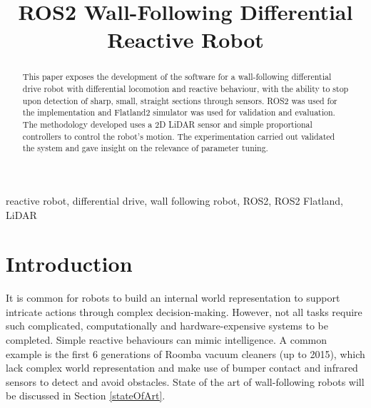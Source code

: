 \documentclass[conference]{IEEEtran}
\begin{document}
\title{ROS2 Wall-Following Differential Reactive Robot\\}

\author{
\and
{}
\and
{}
\and
{}
}

\maketitle

\begin{abstract}
This paper exposes the development of the software for a wall-following differential drive robot with differential locomotion and reactive behaviour, with the ability to stop upon detection of sharp, small, straight sections through sensors. ROS2 was used for the implementation and Flatland2 simulator was used for validation and evaluation. The methodology developed uses a 2D LiDAR sensor and simple proportional controllers to control the robot's motion. The experimentation carried out validated the system and gave insight on the relevance of parameter tuning.
\end{abstract}

\begin{IEEEkeywords}
reactive robot, differential drive, wall following robot, ROS2, ROS2 Flatland, LiDAR
\end{IEEEkeywords}

\section{Introduction}
It is common for robots to build an internal world representation to support intricate actions through complex decision-making. However, not all tasks require such complicated, computationally and hardware-expensive systems to be completed. Simple reactive behaviours can mimic intelligence. A common example is the first 6 generations of Roomba vacuum cleaners (up to 2015), which lack complex world representation and make use of bumper contact and infrared sensors to detect and avoid obstacles. State of the art of wall-following robots will be discussed in Section \ref{stateOfArt}.
\end{document}
